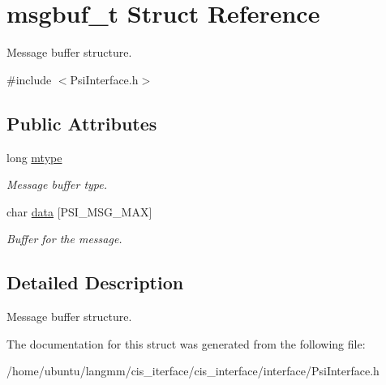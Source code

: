 \hypertarget{structmsgbuf__t}{}\section{msgbuf\+\_\+t Struct Reference}
\label{structmsgbuf__t}


Message buffer structure.  




{\ttfamily \#include $<$Psi\+Interface.\+h$>$}

\subsection*{Public Attributes}
\begin{DoxyCompactItemize}
\item 
\mbox{\label{structmsgbuf__t_a94084fefd8e8fb9a97ad4aab296ca9c4}} 
long \hyperlink{structmsgbuf__t_a94084fefd8e8fb9a97ad4aab296ca9c4}{mtype}
\begin{DoxyCompactList}\small\item\em Message buffer type. \end{DoxyCompactList}\item 
\mbox{\label{structmsgbuf__t_a62a89bab39a8dbb90340eb22ef953ba1}} 
char \hyperlink{structmsgbuf__t_a62a89bab39a8dbb90340eb22ef953ba1}{data} \mbox{[}P\+S\+I\+\_\+\+M\+S\+G\+\_\+\+M\+AX\mbox{]}
\begin{DoxyCompactList}\small\item\em Buffer for the message. \end{DoxyCompactList}\end{DoxyCompactItemize}


\subsection{Detailed Description}
Message buffer structure. 

The documentation for this struct was generated from the following file\+:\begin{DoxyCompactItemize}
\item 
/home/ubuntu/langmm/cis\+\_\+iterface/cis\+\_\+interface/interface/Psi\+Interface.\+h\end{DoxyCompactItemize}
